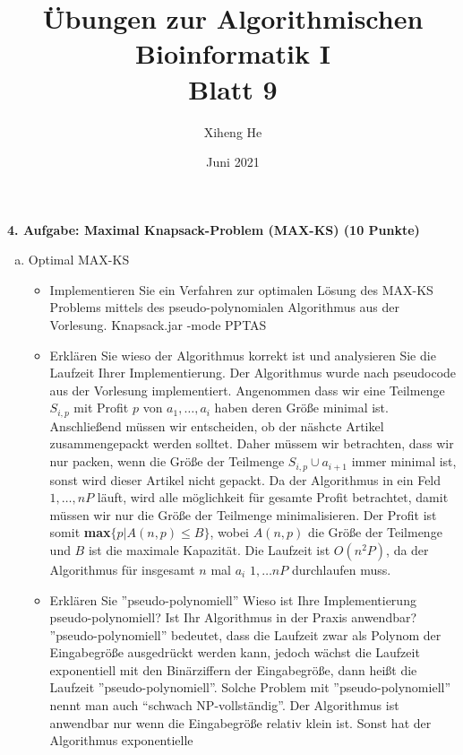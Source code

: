 \documentclass{article}
\title{Übungen zur Algorithmischen Bioinformatik I\\
Blatt 9}
\author{Xiheng He }
\date{Juni 2021}
\begin{document}
\maketitle
\begin{flushleft}
\textbf{4. Aufgabe: Maximal Knapsack-Problem (MAX-KS) (10 Punkte)}
\begin{enumerate}[(a)]
    \item Optimal MAX-KS
    \begin{itemize}
        \item Implementieren Sie ein Verfahren zur optimalen Lösung des MAX-KS Problems mittels des
        pseudo-polynomialen Algorithmus aus der Vorlesung.
        \newline
        Knapsack.jar -mode PPTAS
        \item Erklären Sie wieso der Algorithmus korrekt ist und analysieren Sie die Laufzeit Ihrer Implementierung.
        \newline Der Algorithmus wurde nach pseudocode aus der Vorlesung implementiert. Angenommen dass wir eine Teilmenge
        $S_{i,p}$ mit Profit $p$ von ${a_1,\dots,a_i}$ haben deren Größe minimal ist. Anschließend müssen wir entscheiden,
        ob der näshcte Artikel zusammengepackt werden solltet. Daher müssem wir betrachten, dass wir nur packen, wenn
        die Größe der Teilmenge $S_{i,p} \cup a_{i + 1}$ immer minimal ist, sonst wird dieser Artikel nicht gepackt.
        Da der Algorithmus in ein Feld ${1,\dots,nP}$ läuft, wird alle möglichkeit für gesamte Profit betrachtet, damit müssen
        wir nur die Größe der Teilmenge minimalisieren. Der Profit ist somit \textbf{max$\{p|A(n,p) \leq B\}$}, wobei $A(n,p)$
        die Größe der Teilmenge und $B$ ist die maximale Kapazität. 
        \newline
        Die Laufzeit ist $O(n^2 P)$, da der Algorithmus für insgesamt $n$ mal $a_i$ ${1,\dots nP}$ durchlaufen muss. 
        \item Erklären Sie ”pseudo-polynomiell” Wieso ist Ihre Implementierung pseudo-polynomiell? Ist
        Ihr Algorithmus in der Praxis anwendbar?
        \newline
        ”pseudo-polynomiell” bedeutet, dass die Laufzeit zwar als Polynom der Eingabegröße ausgedrückt werden kann,
        jedoch wächst die Laufzeit exponentiell mit den Binärziffern der Eingabegröße, dann heißt die Laufzeit ”pseudo-polynomiell”.
        Solche Problem mit ”pseudo-polynomiell” nennt man auch ``schwach NP-vollständig''.
        \newline
        Der Algorithmus ist anwendbar nur wenn die Eingabegröße relativ klein ist. Sonst hat der Algorithmus exponentielle 

\end{itemize}
\end{enumerate}
\end{flushleft}
\end{document}
